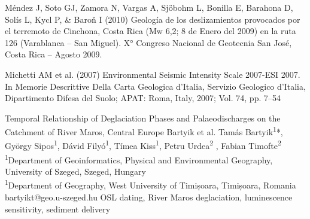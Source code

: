 {Méndez J, Soto GJ, Zamora N, Vargas A, Sjöbohm L, Bonilla E, Barahona D, Solís L, Kycl P, \& Baroň I (2010) Geología de los deslizamientos provocados por el terremoto de Cinchona, Costa Rica (Mw 6,2; 8 de Enero del 2009) en la ruta 126 (Varablanca – San Miguel). X° Congreso Nacional de Geotecnia  San José, Costa Rica -- Agosto 2009.

Michetti AM et al. (2007) Environmental Seismic Intensity Scale 2007-ESI 2007. In Memorie Descrittive Della Carta Geologica d’Italia, Servizio Geologico d’Italia, Dipartimento Difesa del Suolo; APAT: Roma, Italy, 2007; Vol. 74, pp. 7--54
}

\abstract
{Temporal Relationship of Deglaciation Phases and Palaeodischarges on the Catchment of River Maros, Central Europe} %
{Bartyik et al.} %
{Tamás Bartyik\textsuperscript{1}*, György Sipos\textsuperscript{1}, Dávid Filyó\textsuperscript{1}, Tímea Kiss\textsuperscript{1}, Petru Urdea\textsuperscript{2} , Fabian Timofte\textsuperscript{2}} %
{\TLtag} %
{\textsuperscript{1}Department of Geoinformatics, Physical and Environmental Geography, University of Szeged, Szeged, Hungary\\
\textsuperscript{1}Department of Geography, West University of Timișoara, Timișoara, Romania
} %
{bartyikt@geo.u-szeged.hu}  %
{OSL dating, River Maros deglaciation, luminescence sensitivity, sediment delivery}%

